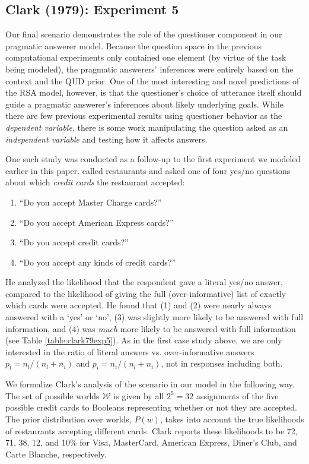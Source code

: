 \documentclass[12pt, floatsintext, jou]{apa6}
\begin{document}
\subsection{Clark (1979): Experiment 5}
Our final scenario demonstrates the role of the questioner component in our pragmatic answerer model. Because the question space in the previous computational experiments only contained one element (by virtue of the task being modeled), the pragmatic answerers' inferences were entirely based on the context and the QUD prior. One of the most interesting and novel predictions of the RSA model, however, is that the questioner's choice of utterance itself should guide a pragmatic answerer's inferences about likely underlying goals. While there are few previous experimental results using questioner behavior as the \emph{dependent variable}, there is some work manipulating the question asked as an \emph{independent variable} and testing how it affects answers.

One such study was conducted as a follow-up to the first experiment we modeled earlier in this paper.   called restaurants and asked one of four yes/no questions about which \emph{credit cards} the restaurant accepted:

\begin{enumerate}
\item ``Do you accept Master Charge cards?'' 
\item ``Do you accept American Express cards?''
\item ``Do you accept credit cards?'' 
\item ``Do you accept any kinds of credit cards?'' 
\end{enumerate}

He analyzed the likelihood that the respondent gave a literal yes/no answer, compared to the likelihood of giving the full (over-informative) list of exactly which cards were accepted.  He found that (1) and (2) were nearly always answered with a `yes' or `no', (3) was slightly more likely to be answered with full information, and (4) was \emph{much} more likely to be answered with full information (see Table \ref{table:clark79exp5}). As in the first case study above, we are only interested in the ratio of literal answers vs. over-informative answers $p_l = n_l/(n_l + n_i)$ and $p_i = n_i/(n_l + n_i)$, not in responses including both. 

We formalize Clark's analysis of the scenario in our model in the following way. The set of possible worlds $\mathcal{W}$ is given by all $2^5 = 32$ assignments of the five possible credit cards to Booleans representing whether or not they are accepted. The prior distribution over worlds, $P(w)$, takes into account the true likelihoods of restaurants accepting different cards. Clark reports these likelihoods to be 72, 71, 38, 12, and 10\% for  Visa, MasterCard, American Express, Diner's Club, and Carte Blanche, respectively. 
\end{document}

